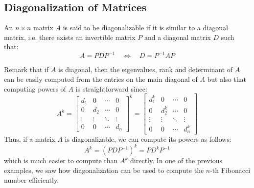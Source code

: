 \subsection{Diagonalization of Matrices}
\begin{definition}
    An $n \times n$ matrix $A$ is said to be diagonalizable if it is similar to a diagonal matrix, i.e. there exists an invertible matrix $P$ and a diagonal matrix $D$ such that:
    \[A = P D P^{-1} \quad \iff \quad D = P^{-1} A P\]
\end{definition}
Remark that if $A$ is diagonal, then the eigenvalues, rank and determinant of $A$ can be easily computed from the entries on the main diagonal of $A$ but also that computing powers of $A$ is straightforward since:
\[A^k = \begin{bmatrix}
    d_1 & 0 & \cdots & 0 \\
    0 & d_2 & \cdots & 0 \\
    \vdots & \vdots & \ddots & \vdots \\
    0 & 0 & \cdots & d_n
\end{bmatrix}^k = \begin{bmatrix}
    d_1^k & 0 & \cdots & 0 \\
    0 & d_2^k & \cdots & 0 \\
    \vdots & \vdots & \ddots & \vdots \\
    0 & 0 & \cdots & d_n^k
\end{bmatrix}\]
Thus, if a matrix $A$ is diagonalizable, we can compute its powers as follows:
\[A^k = (P D P^{-1})^k = P D^k P^{-1}\]
which is much easier to compute than $A^k$ directly. In one of the previous examples, we saw how diagonalization can be used to compute the $n$-th Fibonacci number efficiently.

